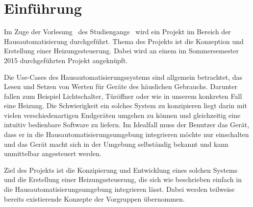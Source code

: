 \section{Einführung}
Im Zuge der Vorlesung \betreff\ des Studiengangs \ausbildungsberuf\ wird ein Projekt im Bereich der Hausautomatisierung durchgeführt.
Thema des Projekts ist die Konzeption und Erstellung einer Heizungssteuerung. Dabei wird an einem im Sommersemester 2015 durchgeführten Projekt angeknüpft.

Die Use-Cases des Hausautomatisierungssystems sind allgemein betrachtet, das Lesen und Setzen von Werten für Geräte des häuslichen Gebrauchs. Darunter fallen zum Beispiel Lichtschalter, Türöffner oder wie in unserem konkreten Fall eine Heizung.
Die Schwierigkeit ein solches System zu konzipieren liegt darin mit vielen verschiedenartigen Endgeräten umgehen zu können und gleichzeitig eine intuitiv bedienbare Software zu liefern. Im Idealfall muss der Benutzer das Gerät, dass er in die Hausautomatisierungsumgebung integrieren möchte nur einschalten und das Gerät macht sich in der Umgebung selbständig bekannt und kann unmittelbar angesteuert werden.

Ziel des Projekts ist die Konzipierung und Entwicklung eines solchen Systems und die Erstellung einer Heizungssteuerung, die sich wie beschrieben einfach in die Hausautomatisierungsumgebung integrieren lässt. Dabei werden teilweise bereits existierende Konzepte der Vorgruppen übernommen.



